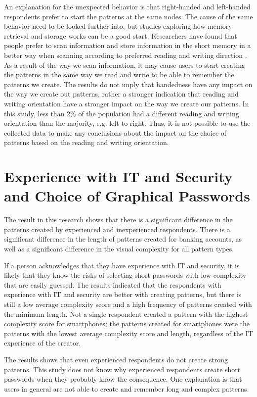     An explanation for the unexpected behavior is that right-handed and left-handed respondents prefer to start the patterns at the same nodes. The cause of the same behavior need to be looked further into, but studies exploring how memory retrieval and storage works can be a good start. Researchers have found that people prefer to scan information and store information in the short memory in a better way when scanning according to preferred reading and writing direction \cite{Chan}. As a result of the way we scan information, it may cause users to start creating the patterns in the same way we read and write to be able to remember the patterns we create. The results do not imply that handedness have any impact on the way we create out patterns, rather a stronger indication that reading and writing orientation have a stronger impact on the way we create our patterns. In this study, less than 2\% of the population had a different reading and writing orientation than the majority, e.g. left-to-right. Thus, it is not possible to use the collected data to make any conclusions about the impact on the choice of patterns based on the reading and writing orientation.

  \section{Experience with IT and Security and Choice of Graphical Passwords}
    
    The result in this research shows that there is a significant difference in the patterns created by experienced and inexperienced respondents. There is a significant difference in the length of patterns created for banking accounts, as well as a significant difference in the visual complexity for all pattern types. 

    If a person acknowledges that they have experience with IT and security, it is likely that they know the risks of selecting short passwords with low complexity that are easily guessed. The results indicated that the respondents with experience with IT and security are better with creating patterns, but there is still a low average complexity score and a high frequency of patterns created with the minimum length. Not a single respondent created a pattern with the highest complexity score for smartphones; the patterns created for smartphones were the patterns with the lowest average complexity score and length, regardless of the IT experience of the creator.

    The results shows that even experienced respondents do not create strong patterns. This study does not know why experienced respondents create short passwords when they probably know the consequence. One explanation is that users in general are not able to create and remember long and complex patterns. 


